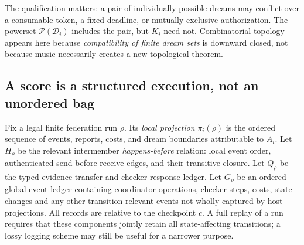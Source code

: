 \documentclass[11pt,letterpaper]{article}
\theoremstyle{definition}
\theoremstyle{remark}
\newcommand{\PSet}{\mathcal{P}}
\newcommand{\Dream}{\mathcal{D}}
\begin{document}
The qualification matters: a pair of individually possible dreams may conflict over a consumable token, a fixed deadline, or mutually exclusive authorization. The powerset $\PSet(\Dream_i)$ includes the pair, but $K_i$ need not. Combinatorial topology appears here because \emph{compatibility of finite dream sets} is downward closed, not because music necessarily creates a new topological theorem.

\subsection{A score is a structured execution, not an unordered bag}
Fix a legal finite federation run $\rho$. Its \emph{local projection} $\pi_i(\rho)$ is the ordered sequence of events, reports, costs, and dream boundaries attributable to $A_i$. Let $H_\rho$ be the relevant intermember \emph{happens-before} relation: local event order, authenticated send-before-receive edges, and their transitive closure. Let $Q_\rho$ be the typed evidence-transfer and checker-response ledger. Let $G_\rho$ be an ordered global-event ledger containing coordinator operations, checker steps, costs, state changes and any other transition-relevant events not wholly captured by host projections. All records are relative to the checkpoint $c$. A full replay of a run requires that these components jointly retain all state-affecting transitions; a lossy logging scheme may still be useful for a narrower purpose.
\end{document}
